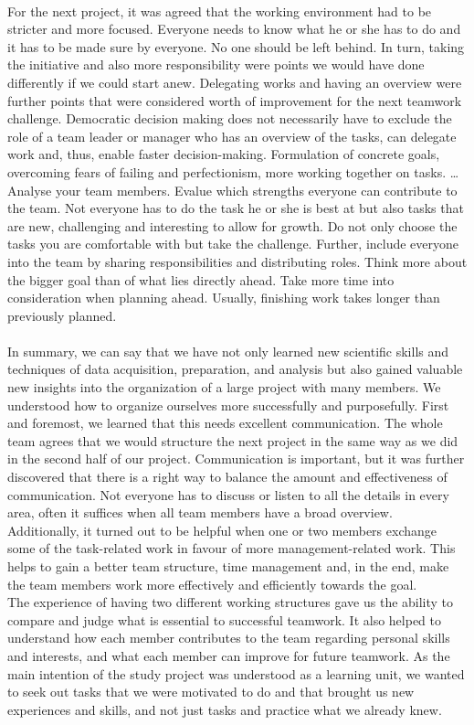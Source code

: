 \\
For the next project, it was agreed that the working environment had to be stricter and more focused. Everyone needs to know what he or she has to do and it has to be made sure by everyone. No one should be left behind. In turn, taking the initiative and also more responsibility were points we would have done differently if we could start anew. Delegating works and having an overview were further points that were considered worth of improvement for the next teamwork challenge. Democratic decision making does not necessarily have to exclude the role of a team leader or manager who has an overview of the tasks, can delegate work and, thus, enable faster decision-making. Formulation of concrete goals, overcoming fears of failing and perfectionism, more working together on tasks. … \\
Analyse your team members. Evalue which strengths everyone can contribute to the team. Not everyone has to do the task he or she is best at but also tasks that are new, challenging and interesting to allow for growth. Do not only choose the tasks you are comfortable with but take the challenge. Further, include everyone into the team by sharing responsibilities and distributing roles. Think more about the bigger goal than of what lies directly ahead. Take more time into consideration when planning ahead. Usually, finishing work takes longer than previously planned. \\
\\
In summary, we can say that we have not only learned new scientific skills and techniques of data acquisition, preparation, and analysis but also gained valuable new insights into the organization of a large project with many members. We  understood how to organize ourselves more successfully and purposefully. First and foremost, we learned that this needs excellent communication. The whole team agrees that we would structure the next project in the same way as we did in the second half of our project. Communication is important, but it was further discovered that there is a right way to balance the amount and effectiveness of communication. Not everyone has to discuss or listen to all the details in every area, often it suffices when all team members have a broad overview.
Additionally, it turned out to be helpful when one or two members exchange some of the task-related work in favour of more management-related work. This helps to gain a better team structure, time management and, in the end, make the team members work more effectively and efficiently towards the goal. \\
The experience of having two different working structures gave us the ability to compare and judge what is essential to successful teamwork. It also helped to understand how each member contributes to the team regarding personal skills and interests, and what each member can improve for future teamwork. As the main intention of the study project was understood as a learning unit, we wanted to seek out tasks that we were motivated to do and that brought us new experiences and skills, and not just tasks and practice what we already knew.

